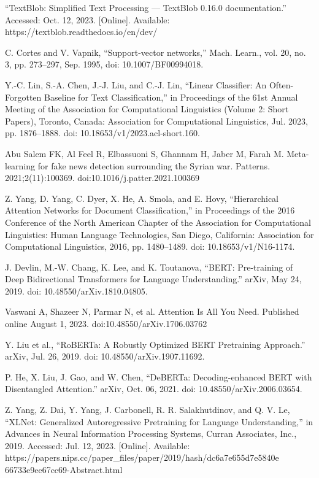 \begin{CJK*}{UTF8}{bkai}
{\begin{thebibliography}{00}
“TextBlob: Simplified Text Processing — TextBlob 0.16.0 documentation.” Accessed: Oct. 12, 2023. [Online]. Available: https://textblob.readthedocs.io/en/dev/

C. Cortes and V. Vapnik, “Support-vector networks,” Mach. Learn., vol. 20, no. 3, pp. 273–297, Sep. 1995, doi: 10.1007/BF00994018.

Y.-C. Lin, S.-A. Chen, J.-J. Liu, and C.-J. Lin, “Linear Classifier: An Often-Forgotten Baseline for Text Classification,” in Proceedings of the 61st Annual Meeting of the Association for Computational Linguistics (Volume 2: Short Papers), Toronto, Canada: Association for Computational Linguistics, Jul. 2023, pp. 1876–1888. doi: 10.18653/v1/2023.acl-short.160.

 Abu Salem FK, Al Feel R, Elbassuoni S, Ghannam H, Jaber M, Farah M. Meta-learning for fake news detection surrounding the Syrian war. Patterns. 2021;2(11):100369. doi:10.1016/j.patter.2021.100369

Z. Yang, D. Yang, C. Dyer, X. He, A. Smola, and E. Hovy, “Hierarchical Attention Networks for Document Classification,” in Proceedings of the 2016 Conference of the North American Chapter of the Association for Computational Linguistics: Human Language Technologies, San Diego, California: Association for Computational Linguistics, 2016, pp. 1480–1489. doi: 10.18653/v1/N16-1174.

J. Devlin, M.-W. Chang, K. Lee, and K. Toutanova, “BERT: Pre-training of Deep Bidirectional Transformers for Language Understanding.” arXiv, May 24, 2019. doi: 10.48550/arXiv.1810.04805.

Vaswani A, Shazeer N, Parmar N, et al. Attention Is All You Need. Published online August 1, 2023. doi:10.48550/arXiv.1706.03762

Y. Liu et al., “RoBERTa: A Robustly Optimized BERT Pretraining Approach.” arXiv, Jul. 26, 2019. doi: 10.48550/arXiv.1907.11692.

P. He, X. Liu, J. Gao, and W. Chen, “DeBERTa: Decoding-enhanced BERT with Disentangled Attention.” arXiv, Oct. 06, 2021. doi: 10.48550/arXiv.2006.03654.

Z. Yang, Z. Dai, Y. Yang, J. Carbonell, R. R. Salakhutdinov, and Q. V. Le, “XLNet: Generalized Autoregressive Pretraining for Language Understanding,” in Advances in Neural Information Processing Systems, Curran Associates, Inc., 2019. Accessed: Jul. 12, 2023. [Online]. Available: https://papers.nips.cc/paper\_files/paper/2019/hash/dc6a7e655d7e5840e\\66733e9ee67cc69-Abstract.html


\end{thebibliography}}
\end{CJK*}
